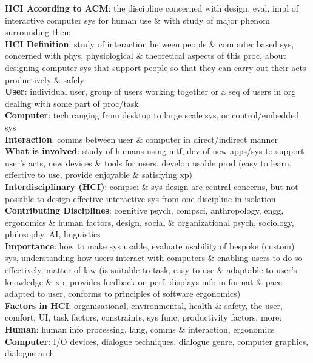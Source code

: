 \documentclass[a4paper]{article}
\begin{document}
    \tiny
    \begin{multicols}{3}
        \noindent\textbf{HCI According to ACM}: the discipline concerned with design, eval, impl of interactive computer sys for human use \& with study of major phenom surrounding them\\
        \textbf{HCI Definition}: study of interaction between people \& computer based sys, concerned with phys, physiological \& theoretical aspects of this proc, about designing computer sys that support people so that they can carry out their acts productively \& safely\\
        \textbf{User}: individual user, group of users working together or a seq of users in org dealing with some part of proc/task\\
        \textbf{Computer}: tech ranging from desktop to large scale sys, or control/embedded sys\\
        \textbf{Interaction}: comms between user \& computer in direct/indirect manner\\
        \textbf{What is involved}: study of humans using intf, dev of new apps/sys to support user's acts, new devices \& tools for users, develop usable prod (easy to learn, effective to use, provide enjoyable \& satisfying xp)\\
        \textbf{Interdisciplinary (HCI)}: compsci \& sys design are central concerns, but not possible to design effective interactive sys from one discipline in isolation\\
        \textbf{Contributing Disciplines}: cognitive psych, compsci, anthropology, engg, ergonomics \& human factors, design, social \& organizational psych, sociology, philosophy, AI, linguistics\\
        \textbf{Importance}: how to make sys usable, evaluate usability of bespoke (custom) sys, understanding how users interact with computers \& enabling users to do so effectively, matter of law (is suitable to task, easy to use \& adaptable to user's knowledge \& xp, provides feedback on perf, displays info in format \& pace adapted to user, conforms to principles of software ergonomics)\\
        \textbf{Factors in HCI}: organisational, environmental, health \& safety, the user, comfort, UI, task factors, constraints, sys func, productivity factors, more:\\
        \textbf{Human}: human info processing, lang, comms \& interaction, ergonomics\\
        \textbf{Computer}: I/O devices, dialogue techniques, dialogue genre, computer graphics, dialogue arch\\

\end{multicols}
\end{document}
